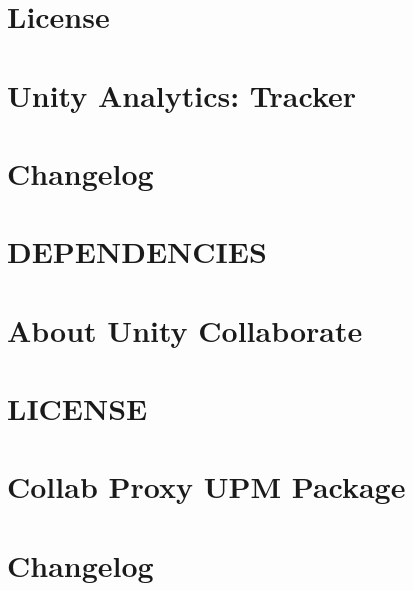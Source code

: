 \let\mypdfximage\pdfximage\def\pdfximage{\immediate\mypdfximage}\documentclass[twoside]{book}
\newcommand{\+}{\discretionary{\mbox{\scriptsize$\hookleftarrow$}}{}{}}
\begin{document}
\chapter{License}
\label{md_Library_PackageCache_com_8unity_8analytics_0d3_82_82_License}

\chapter{Unity Analytics\+: Tracker}
\label{md_Library_PackageCache_com_8unity_8analytics_0d3_82_82_README}

\chapter{Changelog}
\label{autotoc_md29}

\chapter{D\+E\+P\+E\+N\+D\+E\+N\+C\+I\+ES}
\label{md_Library_PackageCache_com_8unity_8collab-proxy_0d1_82_815_DEPENDENCIES}

\chapter{About Unity Collaborate}
\label{autotoc_md37}

\chapter{L\+I\+C\+E\+N\+SE}
\label{md_Library_PackageCache_com_8unity_8collab-proxy_0d1_82_815_LICENSE}

\chapter{Collab Proxy U\+PM Package}
\label{autotoc_md38}

\chapter{Changelog}
\label{autotoc_md43}

\end{document}
